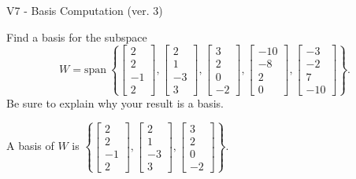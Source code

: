 \begin{exercise}
  \begin{exerciseTitle}V7 - Basis Computation (ver. 3)\end{exerciseTitle}
  \begin{exerciseStatement}
    Find a basis for the subspace 
\[W=\mathrm{span}\ \left\{\left[\begin{array}{r}
2 \\
2 \\
-1 \\
2
\end{array}\right] , \left[\begin{array}{r}
2 \\
1 \\
-3 \\
3
\end{array}\right] , \left[\begin{array}{r}
3 \\
2 \\
0 \\
-2
\end{array}\right] , \left[\begin{array}{r}
-10 \\
-8 \\
2 \\
0
\end{array}\right] , \left[\begin{array}{r}
-3 \\
-2 \\
7 \\
-10
\end{array}\right]\right\}.\]
 Be sure to explain why your result is a basis.


  \end{exerciseStatement}
  \begin{exerciseAnswer}
   A basis of \(W\) is  \(\left\{\left[\begin{array}{r}
2 \\
2 \\
-1 \\
2
\end{array}\right] , \left[\begin{array}{r}
2 \\
1 \\
-3 \\
3
\end{array}\right] , \left[\begin{array}{r}
3 \\
2 \\
0 \\
-2
\end{array}\right]\right\}\).
  


  \end{exerciseAnswer}
\end{exercise}